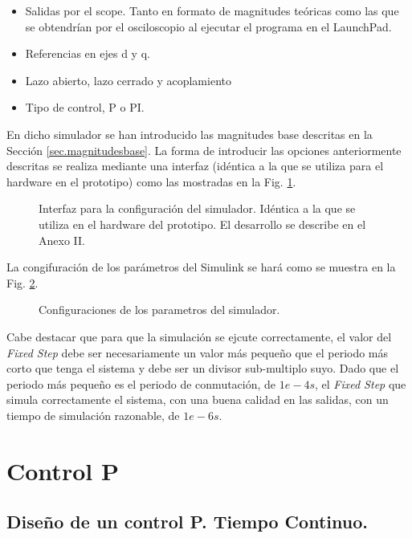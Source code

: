 \documentclass{report}
\begin{document}
\begin{itemize}
    \item Salidas por el scope. Tanto en formato de magnitudes teóricas como las que se obtendrían por el osciloscopio al ejecutar el programa en el LaunchPad.
    \item Referencias en ejes d y q.
    \item Lazo abierto, lazo cerrado y acoplamiento
    \item Tipo de control, P o PI.
\end{itemize}
En dicho simulador se han introducido las magnitudes base descritas en la Sección \ref{sec.magnitudesbase}.  
La forma de introducir las opciones anteriormente descritas se realiza mediante una interfaz (idéntica a la que se utiliza para el hardware en el prototipo) como las mostradas en la Fig. \ref{fig.configuraciones_simulink}.

\begin{figure}[!h]
    \centering
    \caption{Interfaz para la configuración del simulador. Idéntica a la que se utiliza en el hardware del prototipo. El desarrollo se describe en el Anexo II.}
    \label{fig.configuraciones_simulink}
\end{figure} 

La congifuración de los parámetros del Simulink se hará como se muestra en la Fig. \ref{fig.configuraciones_simulador_simulink}.

\begin{figure}[!h]
    \centering
    \caption{Configuraciones de los parametros del simulador.}
    \label{fig.configuraciones_simulador_simulink}
\end{figure} 

Cabe destacar que para que la simulación se ejcute correctamente, el valor del \textit{Fixed Step} debe ser necesariamente un valor más pequeño que el periodo más corto que tenga el sistema y debe ser un divisor sub-multiplo suyo. Dado que el periodo más pequeño es el periodo de conmutación, de $1 e-4 s$, el \textit{Fixed Step} que simula correctamente el sistema, con una buena calidad en las salidas, con un tiempo de simulación razonable, de $1e-6s$.

\clearpage
\section{Control P}
\subsection{Diseño de un control P. Tiempo Continuo.} \label{sec.controlp}
\end{document}
